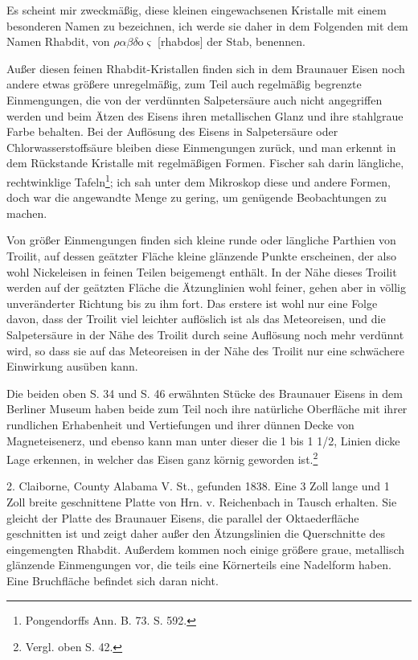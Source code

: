 \documentclass[a4paper, 11pt, oneside]{article}
\begin{document}
Es scheint mir zweckmäßig, diese kleinen eingewachsenen Kristalle mit einem besonderen Namen zu bezeichnen, ich werde sie daher in dem Folgenden mit dem Namen Rhabdit, von $\rho\alpha\beta\delta$o$\varsigma$ [rhabdos] der Stab, benennen.

Außer diesen feinen Rhabdit-Kristallen finden sich in dem Braunauer Eisen noch andere etwas größere unregelmäßig, zum Teil auch regelmäßig begrenzte Einmengungen, die von der verdünnten Salpetersäure auch nicht angegriffen werden und beim Ätzen des Eisens ihren metallischen Glanz und ihre stahlgraue Farbe behalten. Bei der Auflösung des Eisens in Salpetersäure oder Chlorwasserstoffsäure bleiben diese Einmengungen zurück, und man erkennt in dem Rückstande Kristalle mit regelmäßigen Formen. Fischer sah darin längliche, rechtwinklige Tafeln\footnote{Pongendorffs Ann. B. 73. S. 592.}; ich sah unter dem Mikroskop diese und andere Formen, doch war die angewandte Menge zu gering, um genügende Beobachtungen zu machen.

Von größer Einmengungen finden sich kleine runde oder längliche Parthien von Troilit, auf dessen geätzter Fläche kleine glänzende Punkte erscheinen, der also wohl Nickeleisen in feinen Teilen beigemengt enthält. In der Nähe dieses Troilit werden auf der geätzten Fläche die Ätzunglinien wohl feiner, gehen aber in völlig unveränderter Richtung bis zu ihm fort. Das erstere ist wohl nur eine Folge davon, dass der Troilit viel leichter auflöslich ist als das Meteoreisen, und die Salpetersäure in der Nähe des Troilit durch seine Auflösung noch mehr verdünnt wird, so dass sie auf das Meteoreisen in der Nähe des Troilit nur eine schwächere Einwirkung ausüben kann.

Die beiden oben S. 34 und S. 46 erwähnten Stücke des Braunauer Eisens in dem Berliner Museum haben beide zum Teil noch ihre natürliche Oberfläche mit ihrer rundlichen Erhabenheit und Vertiefungen und ihrer dünnen Decke von Magneteisenerz, und ebenso kann man unter dieser die 1 bis 1 1/2, Linien dicke Lage erkennen, in welcher das Eisen ganz körnig geworden ist.\footnote{Vergl. oben S. 42.}

2. Claiborne, County Alabama V. St., gefunden 1838. Eine 3 Zoll lange und 1 Zoll breite geschnittene Platte von Hrn. v. Reichenbach in Tausch erhalten. Sie gleicht der Platte des Braunauer Eisens, die parallel der Oktaederfläche geschnitten ist und zeigt daher außer den Ätzungslinien die Querschnitte des eingemengten Rhabdit. Außerdem kommen noch einige größere graue, metallisch glänzende Einmengungen vor, die teils eine Körnerteils eine Nadelform haben. Eine Bruchfläche befindet sich daran nicht.
\end{document}
